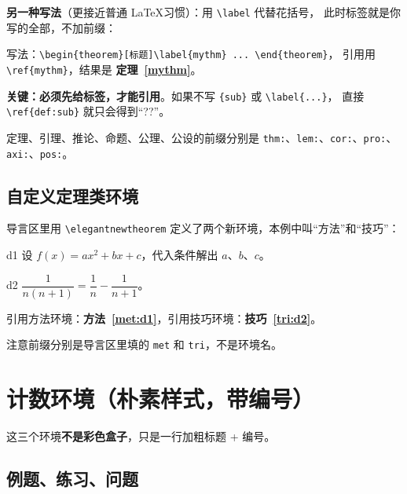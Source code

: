 \documentclass[lang=cn,newtx,10pt,scheme=chinese,nofont]{elegantbook}
\begin{document}
\textbf{另一种写法}（更接近普通 \LaTeX 习惯）：用 \verb|\label| 代替花括号，
此时标签就是你写的全部，不加前缀：

\begin{theorem}[另一种标签写法]\label{mythm}
写法：\verb|\begin{theorem}[标题]\label{mythm} ... \end{theorem}|，
引用用 \verb|\ref{mythm}|，结果是 \textbf{定理~\ref{mythm}}。
\end{theorem}

\textbf{关键：必须先给标签，才能引用}。如果不写 \texttt{\{sub\}} 或 \verb|\label{...}|，
直接 \verb|\ref{def:sub}| 就只会得到“??”。

定理、引理、推论、命题、公理、公设的前缀分别是
\texttt{thm:}、\texttt{lem:}、\texttt{cor:}、\texttt{pro:}、\texttt{axi:}、\texttt{pos:}。

\section{自定义定理类环境}

导言区里用 \verb|\elegantnewtheorem| 定义了两个新环境，本例中叫“方法”和“技巧”：

\begin{method}[待定系数法]{d1}
设 $f(x)=ax^2+bx+c$，代入条件解出 $a$、$b$、$c$。
\end{method}

\begin{trick}[裂项相消]{d2}
$\dfrac{1}{n(n+1)}=\dfrac{1}{n}-\dfrac{1}{n+1}$。
\end{trick}

引用方法环境：\textbf{方法~\ref{met:d1}}，引用技巧环境：\textbf{技巧~\ref{tri:d2}}。

注意前缀分别是导言区里填的 \texttt{met} 和 \texttt{tri}，不是环境名。


\chapter{计数环境（朴素样式，带编号）}

这三个环境\textbf{不是彩色盒子}，只是一行加粗标题 + 编号。

\section{例题、练习、问题}
\end{document}
